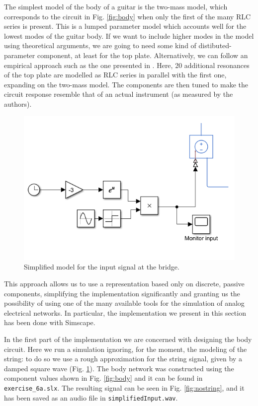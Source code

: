\documentclass[a4paper]{article}
\begin{document}
The simplest model of the body of a guitar is the two-mass model, which corresponds to the circuit in Fig. \ref{fig:body} when only the first of the many RLC series is present. This is a lumped parameter model which accounts well for the lowest modes of the guitar body. If we want to include higher modes in the model using theoretical arguments, we are going to need some kind of distibuted-parameter component, at least for the top plate. Alternatively, we can follow an empirical approach such as the one presented in \cite{leefrench}. Here, 20 additional resonances of the top plate are modelled as RLC series in parallel with the first one, expanding on the two-mass model. The components are then tuned to make the circuit response resemble that of an actual instrument (as measured by the authors). 
\begin{figure}
	\centering
	\includegraphics[width=0.98\linewidth]{inputModel.png}
	\caption{Simplified model for the input signal at the bridge.}
	\label{fig:dampsquare}
\end{figure}
This approach allows us to use a representation based only on discrete, passive components, simplifying the implementation significantly and granting us the possibility of using one of the many available tools for the simulation of analog electrical networks. In particular, the implementation we present in this section has been done with Simscape.


In the first part of the implementation we are concerned with designing the body circuit. Here we run a simulation ignoring, for the moment, the modeling of the string: to do so we use a rough approximation for the string signal, given by a damped square wave (Fig. \ref{fig:dampsquare}). The body network was constructed using the component values shown in Fig. \ref{fig:body} and it can be found in \texttt{exercise\_6a.slx}. The resulting signal can be seen in Fig. \ref{fig:nostring}, and it has been saved as an audio file in \texttt{simplifiedInput.wav}.
\end{document}
